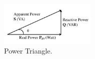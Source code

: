 \begin{figure}[ht]
\centering
\includegraphics[width=1.8in]{figs/powerTriangle.pdf}
\caption{Power Triangle.}
\label{fig_powerTriangle}
\end{figure}
